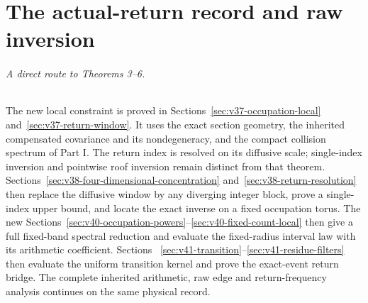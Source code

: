 \documentclass[11pt,reqno]{amsart}
\numberwithin{equation}{section}
\theoremstyle{definition}\newtheorem{definition}[theorem]{Definition}
\theoremstyle{remark}\newtheorem{remark}[theorem]{Remark}
\begin{document}
\part{The actual-return record and raw inversion}
\paragraph{A direct route to Theorems 3--6.}
The new local constraint is proved in
Sections~\ref{sec:v37-occupation-local} and~\ref{sec:v37-return-window}.
It uses the exact section geometry, the inherited compensated
covariance and its nondegeneracy, and the compact collision spectrum
of Part I. The return index is resolved on its diffusive scale;
single-index inversion and pointwise roof inversion remain distinct
from that theorem. Sections~\ref{sec:v38-four-dimensional-concentration}
and~\ref{sec:v38-return-resolution} then replace the diffusive window
by any diverging integer block, prove a single-index upper bound, and
locate the exact inverse on a fixed occupation torus. The new
Sections~\ref{sec:v40-occupation-powers}--\ref{sec:v40-fixed-count-local}
then give a full fixed-band spectral reduction and evaluate the
fixed-radius interval law with its arithmetic coefficient. Sections~
\ref{sec:v41-transition}--\ref{sec:v41-residue-filters} then evaluate
the uniform transition kernel and prove the exact-event return bridge. The
complete inherited arithmetic, raw edge and return-frequency analysis
continues on the same physical record.

















\end{document}
